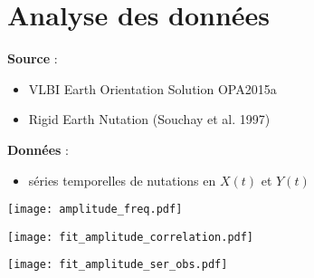 \section{Analyse des données}

\begin{frame}
\textbf{Source} :\\
	\begin{itemize}
		\item VLBI Earth Orientation Solution OPA2015a	
		\item Rigid Earth Nutation (Souchay et al. 1997)
	\end{itemize}
\textbf{Données} :
	\begin{itemize}
	\item séries temporelles de nutations en $X(t)$ et $Y(t)$
	\end{itemize}
	\vfill
\end{frame}

\begin{frame}
	\begin{center}
		\texttt{[image: amplitude\_freq.pdf]}
	\end{center}
\end{frame}

\begin{frame}
  \centerline{\texttt{[image: fit\_amplitude\_correlation.pdf]}}
\end{frame}


\begin{frame}
	\begin{center}
		\texttt{[image: fit\_amplitude\_ser\_obs.pdf]}
	\end{center} 
\end{frame}

